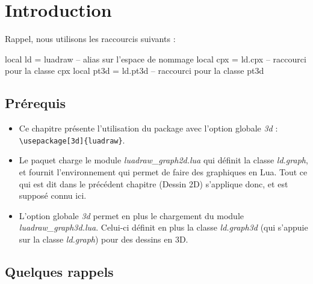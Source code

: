 \section{Introduction}

Rappel, nous utilisons les raccourcis suivants :

\begin{Luacode}
local ld = luadraw -- alias sur l'espace de nommage
local cpx = ld.cpx -- raccourci pour la classe cpx
local pt3d = ld.pt3d -- raccourci pour la classe pt3d
\end{Luacode}

\subsection{Prérequis}

\begin{itemize}
\item Ce chapitre présente l'utilisation du package \luadrawenv avec l'option globale \emph{3d} :
\verb|\usepackage[3d]{luadraw}|.
\item Le paquet charge le module \emph{luadraw\_graph2d.lua} qui définit la classe \emph{ld.graph}, et fournit l'environnement \luadrawenv qui permet de faire des graphiques en Lua. Tout ce qui est dit dans le précédent chapitre (Dessin 2D) s'applique donc, et est supposé connu ici.
\item L'option globale \emph{3d} permet en plus le chargement du module \emph{luadraw\_graph3d.lua}. Celui-ci définit en plus la classe \emph{ld.graph3d} (qui s'appuie sur la classe \emph{ld.graph}) pour des dessins en 3D. 
\end{itemize}

\subsection{Quelques rappels}

